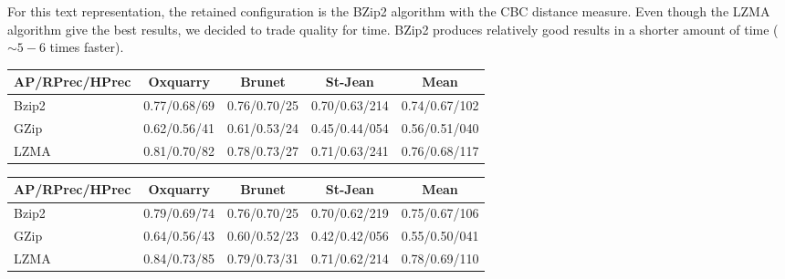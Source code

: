 For this text representation, the retained configuration is the BZip2 algorithm with the CBC distance measure.
Even though the LZMA algorithm give the best results, we decided to trade quality for time.
BZip2 produces relatively good results in a shorter amount of time ($\sim 5-6$ times faster).

\begin{table*}[!t]
  \centering
  \caption{Compression methods evaluation with different compression algorithm and distance metrics}
  \label{tab:compression_evaluation_results}

  \begin{tabular}{l c c c|c}
    \toprule
    AP/RPrec/HPrec & Oxquarry     & Brunet       & St-Jean       & Mean \\
    \midrule
    Bzip2          & 0.77/0.68/69 & 0.76/0.70/25 & 0.70/0.63/214 & 0.74/0.67/102\\
    GZip           & 0.62/0.56/41 & 0.61/0.53/24 & 0.45/0.44/054 & 0.56/0.51/040\\
    LZMA           & 0.81/0.70/82 & 0.78/0.73/27 & 0.71/0.63/241 & 0.76/0.68/117\\
    \bottomrule
  \end{tabular}

  \vspace{0.5cm}

  \begin{tabular}{l c c c|c}
    \toprule
    AP/RPrec/HPrec & Oxquarry     & Brunet       & St-Jean       & Mean\\
    \midrule
    Bzip2          & 0.79/0.69/74 & 0.76/0.70/25 & 0.70/0.62/219 & 0.75/0.67/106\\
    GZip           & 0.64/0.56/43 & 0.60/0.52/23 & 0.42/0.42/056 & 0.55/0.50/041\\
    LZMA           & 0.84/0.73/85 & 0.79/0.73/31 & 0.71/0.62/214 & 0.78/0.69/110\\
    \bottomrule
  \end{tabular}

\end{table*}

